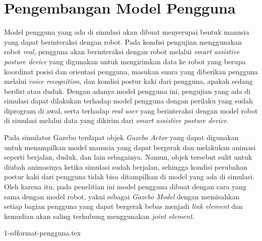\section{Pengembangan Model Pengguna}
\label{sec:modelpengguna}

Model pengguna yang ada di simulasi akan dibuat menyerupai bentuk manusia yang dapat berinteraksi dengan robot.
Pada kondisi pengujian menggunakan robot \emph{real},
  pengguna akan berinteraksi dengan robot melalui \emph{smart assistive posture device} yang digunakan untuk mengirimkan data ke robot yang berupa koordinat posisi dan orientasi pengguna,
  masukan suara yang diberikan pengguna melalui \emph{voice recognition},
  dan kondisi postur kaki dari pengguna, apakah sedang berdiri atau duduk.
Dengan adanya model pengguna ini,
  pengujian yang ada di simulasi dapat dilakukan terhadap model pengguna dengan perilaku yang sudah diprogram di awal,
  serta terhadap \emph{real user} yang berinteraksi dengan model robot di simulasi melalui data yang dikirim dari \emph{smart assistive posture device}.

Pada simulator Gazebo terdapat objek \emph{Gazebo Actor} yang dapat digunakan untuk menampilkan model manusia yang dapat bergerak dan melakukan animasi seperti berjalan, duduk, dan lain sebagainya.
Namun, objek tersebut sulit untuk diubah animasinya ketika simulasi sudah berjalan,
  sehingga kondisi perubahan postur kaki dari pengguna tidak bisa ditampilkan di model yang ada di simulasi.
Oleh karena itu, pada penelitian ini model pengguna dibuat dengan cara yang sama dengan model robot,
  yakni sebagai \emph{Gazebo Model} dengan memisahkan setiap bagian pengguna yang dapat bergerak bebas menjadi \emph{link element} dan kemudian akan saling terhubung menggunakan \emph{joint element}.

{1-sdformat-pengguna.tex}
